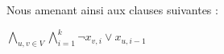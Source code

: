 \documentclass[a4paper]{article}
\begin{document}
\begin{enumerate}
Nous amenant ainsi aux clauses suivantes : \\
\begin{center}
$\bigwedge\limits_{u,v∈V}^{} \bigwedge\limits_{i=1}^{k} \neg x_{v,i} \vee x_{u,i-1}$
\end{center}

\end{enumerate}

\end{document}
